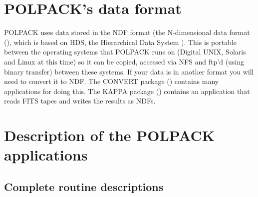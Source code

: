 \section{POLPACK's data format}
POLPACK uses data stored in the NDF format (the N-dimensional data
format (), which is based on HDS,
the Hierarchical Data System ).
This is portable between the operating
systems that POLPACK runs on (Digital UNIX, Solaris and Linux at this time)
so it can be copied, accessed via NFS and ftp'd (using binary
transfer) between these systems. If your data is in another format you
will need to convert it to NDF. The CONVERT package
() contains many applications for doing this. The
KAPPA package () contains an application
 that reads FITS tapes and writes the
results as NDFs.

\newpage
\appendix
\section{Description of the POLPACK applications \label{app:description}}
\begin{latexonly}
%
%








\end{latexonly}

\subsection{Complete routine descriptions \label{descriptions}}

